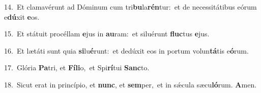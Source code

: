 {\numbfont\textcolor{\numbcolor}{14.}}~Et clamavérunt ad Dóminum cum tri\-\textbf{bu}\-la\-\textbf{rén}\-tur:~\star et de necessitátibus eórum e\-\textbf{dú}\-xit \textbf{e}\-os.\par
{\numbfont\textcolor{\numbcolor}{15.}}~Et státuit procéllam \textbf{e}\-jus in \textbf{au}\-ram:~\star et siluérunt \textbf{fluc}\-tus \textbf{e}\-jus.\par
{\numbfont\textcolor{\numbcolor}{16.}}~Et lætáti sunt quia \textbf{si}\-lu\-\textbf{é}\-runt:~\star et dedúxit eos in portum volun\-\textbf{tá}\-tis e\-\textbf{ó}\-rum.\par
{\numbfont\textcolor{\numbcolor}{17.}}~Glória \textbf{Pa}\-tri, et \textbf{Fí}\-\textbf{li}o,~\star et Spi\-\textbf{rí}\-tui \textbf{Sanc}\-to.\par
{\numbfont\textcolor{\numbcolor}{18.}}~Sicut erat in princípio, et \textbf{nunc}\-, et \textbf{sem}\-per,~\star et in sǽcula sæcu\-\textbf{ló}\-rum. \textbf{A}\-men.\par
